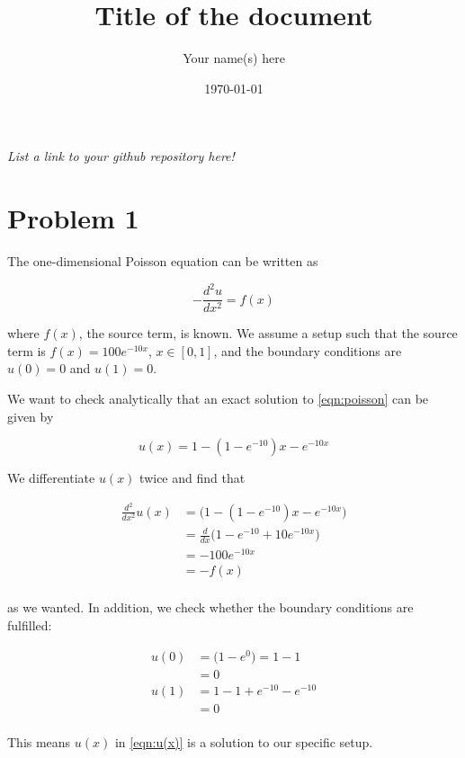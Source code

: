 \documentclass[english,notitlepage]{revtex4-1}  %
\begin{document}
\title{Title of the document}      %
\author{Your name(s) here}          %
\date{\today}                             %
\noaffiliation                            %


\maketitle

\textit{List a link to your github repository here!}

\section*{Problem 1}

  The one-dimensional Poisson equation can be written as

  \begin{equation}
    -\frac{d^2 u}{dx^2} = f(x) \label{eqn:poisson}
  \end{equation}

  where $f(x)$, the source term, is known. We assume a setup such that the source term is $f(x) = 100e^{-10x}$, $x \in [0, 1]$, and the boundary conditions are $u(0) = 0$ and $u(1)=0$.


  We want to check analytically that an exact solution to \eqref{eqn:poisson} can be given by

  \begin{equation}
    u(x) = 1 - (1-e^{-10})x - e^{-10x} \label{eqn:u(x)}
  \end{equation}

  We differentiate $u(x)$ twice and find that

  \begin{equation}
    \begin{split}
      \frac{d^2}{dx^2} u(x) &= \bigg( 1 - (1-e^{-10} ) x - e^{-10x} \bigg) \\
      &=  \frac{d}{dx} \bigg( 1-e^{-10} + 10 e^{-10x} \bigg) \\
      &=  - 100 e^{-10x} \\
      &= -f(x) \\
    \end{split}
  \end{equation}

  as we wanted. In addition, we check whether the boundary conditions are fulfilled:

  \begin{equation}
    \begin{split}
      u(0) &= \big( 1 - e^0 \big) = 1-1 \\
      &= 0 \\
      u(1) &= 1-1+e^{-10} - e^{-10} \\
      &= 0 \\
    \end{split}
  \end{equation}

  This means $u(x)$ in \eqref{eqn:u(x)} is a solution to our specific setup.
\end{document}
